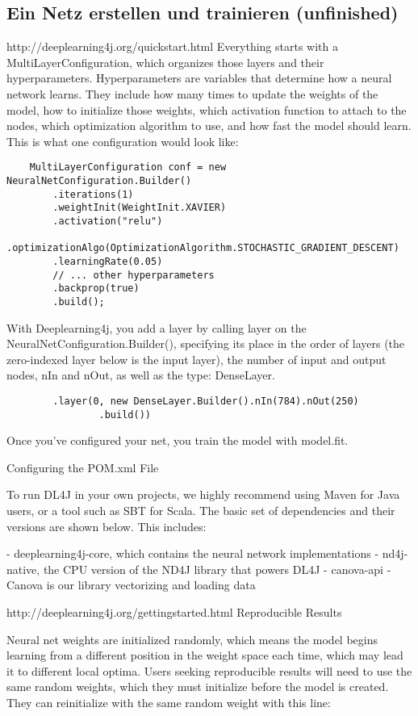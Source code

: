 {\subsection{Ein Netz erstellen und trainieren (unfinished)}
http://deeplearning4j.org/quickstart.html
Everything starts with a MultiLayerConfiguration, which organizes those layers and their hyperparameters.
Hyperparameters are variables that determine how a neural network learns. They include how many times to update the weights of the model, how to initialize those weights, which activation function to attach to the nodes, which optimization algorithm to use, and how fast the model should learn. This is what one configuration would look like:
\begin{lstlisting}
    MultiLayerConfiguration conf = new NeuralNetConfiguration.Builder()
        .iterations(1)
        .weightInit(WeightInit.XAVIER)
        .activation("relu")
        .optimizationAlgo(OptimizationAlgorithm.STOCHASTIC_GRADIENT_DESCENT)
        .learningRate(0.05)
        // ... other hyperparameters
        .backprop(true)
        .build();
\end{lstlisting}
With Deeplearning4j, you add a layer by calling layer on the NeuralNetConfiguration.Builder(), specifying its place in the order of layers (the zero-indexed layer below is the input layer), the number of input and output nodes, nIn and nOut, as well as the type: DenseLayer.
\begin{lstlisting}
        .layer(0, new DenseLayer.Builder().nIn(784).nOut(250)
                .build())
\end{lstlisting}
Once you’ve configured your net, you train the model with model.fit.

Configuring the POM.xml File

To run DL4J in your own projects, we highly recommend using Maven for Java users, or a tool such as SBT for Scala. The basic set of dependencies and their versions are shown below. This includes:

   -  deeplearning4j-core, which contains the neural network implementations
   -  nd4j-native, the CPU version of the ND4J library that powers DL4J
    - canova-api - Canova is our library vectorizing and loading data



http://deeplearning4j.org/gettingstarted.html
Reproducible Results

Neural net weights are initialized randomly, which means the model begins learning from a different position in the weight space each time, which may lead it to different local optima. Users seeking reproducible results will need to use the same random weights, which they must initialize before the model is created. They can reinitialize with the same random weight with this line:

}
